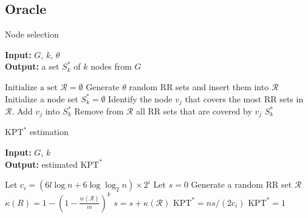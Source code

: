 \documentclass[a4paper,12pt]{article}
\begin{document}
\subsection{Oracle}
\label{sscn:oracle}


\begin{algorithm}
\caption{Node selection}\label{alg:oracle}
\hspace*{\algorithmicindent} \textbf{Input: } $G$, $k$, $\theta$\\
\hspace*{\algorithmicindent} \textbf{Output: } a set $S_k^*$ of $k$ nodes from $G$
\begin{algorithmic}[1]
\State $\text{Initialize a set } \mathcal{R} = \emptyset$
\State Generate $\theta$ random RR sets and insert them into $\mathcal{R}$
\State Initialize a node set $S_k^* = \emptyset$
\State Identify the node $v_j$ that covers the most RR sets in $\mathcal{R}$.
\State Add $v_j$ into $S_k^*$
\State Remove from $\mathcal{R}$ all RR sets that are covered by $v_j$
\EndFor
\State\Return $S_k^*$
\end{algorithmic}
\end{algorithm}

\begin{algorithm}
\caption{$\text{KPT}^*$ estimation}\label{alg:kptestimation}
\hspace*{\algorithmicindent} \textbf{Input: } $G$, $k$\\
\hspace*{\algorithmicindent} \textbf{Output: } estimated $\text{KPT}^*$
\begin{algorithmic}[1]
\State Let $c_i = (6l\log n + 6\log\log_2 n)\times 2^i$
\State Let $s = 0$
\State Generate a random RR set $\mathcal{R}$
\State $\kappa(R) = 1 - \left(1-\frac{w(\mathcal{R})}{m}\right)^k$
\State $s = s + \kappa(\mathcal{R})$
\EndFor
{}
\State\Return $\text{KPT}^* = ns/(2c_i)$
\EndIf
\State\Return $\text{KPT}^* = 1$
\EndFor
\end{algorithmic}
\end{algorithm}
\end{document}
